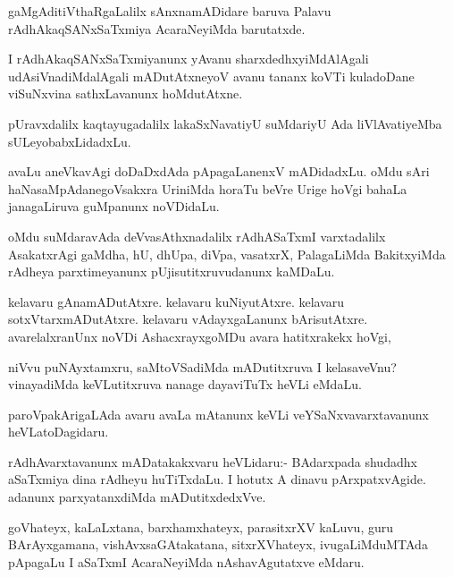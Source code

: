 \begin{mng}
gaMgAditiVthaRgaLalilx sAnxnamADidare baruva Palavu rAdhAkaqSANxSaTxmiya AcaraNeyiMda barutatxde.
\end{mng}

\begin{mng}
I rAdhAkaqSANxSaTxmiyanunx yAvanu sharxdedhxyiMdAlAgali udAsiVnadiMdalAgali mADutAtxneyoV avanu tananx koVTi kuladoDane viSuNxvina sathxLavanunx hoMdutAtxne.
\end{mng}

\begin{mng}
pUravxdalilx kaqtayugadalilx lakaSxNavatiyU suMdariyU Ada liVlAvatiyeMba sULeyobabxLidadxLu.
\end{mng}

\begin{mng}
avaLu aneVkavAgi doDaDxdAda pApagaLanenxV mADidadxLu. oMdu sAri haNasaMpAdanegoVsakxra UriniMda horaTu beVre Urige hoVgi bahaLa janagaLiruva guMpanunx noVDidaLu.
\end{mng}

\begin{mng}
oMdu suMdaravAda deVvasAthxnadalilx rAdhASaTxmI varxtadalilx AsakatxrAgi gaMdha, hU, dhUpa, diVpa, vasatxrX, PalagaLiMda BakitxyiMda rAdheya parxtimeyanunx pUjisutitxruvudanunx kaMDaLu.
\end{mng}

\begin{mng}
kelavaru gAnamADutAtxre. kelavaru kuNiyutAtxre. kelavaru sotxVtarxmADutAtxre. kelavaru vAdayxgaLanunx bArisutAtxre. avarelalxranUnx noVDi AshacxrayxgoMDu avara hatitxrakekx hoVgi,
\end{mng}

\begin{mng}
niVvu puNAyxtamxru, saMtoVSadiMda mADutitxruva I kelasaveVnu? vinayadiMda keVLutitxruva nanage dayaviTuTx heVLi eMdaLu.
\end{mng}

\begin{mng}
paroVpakArigaLAda avaru avaLa mAtanunx keVLi veYSaNxvavarxtavanunx heVLatoDagidaru.
\end{mng}

\begin{mng}
rAdhAvarxtavanunx mADatakakxvaru heVLidaru:- BAdarxpada shudadhx aSaTxmiya dina rAdheyu huTiTxdaLu. I hotutx A dinavu pArxpatxvAgide. adanunx parxyatanxdiMda mADutitxdedxVve.
\end{mng}

\begin{mng}
goVhateyx, kaLaLxtana, barxhamxhateyx, parasitxrXV kaLuvu, guru BArAyxgamana, vishAvxsaGAtakatana, sitxrXVhateyx, ivugaLiMduMTAda pApagaLu I aSaTxmI AcaraNeyiMda nAshavAgutatxve eMdaru.
\end{mng}

